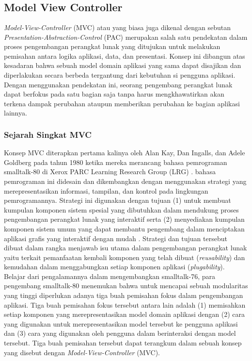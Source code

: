 \chapter{\babDua}

\section{Model View Controller}
\noindent
\textit{Model-View-Controller} (MVC) atau yang biasa juga dikenal dengan sebutan \textit{Presentation-Abstraction-Control} (PAC) merupakan salah satu pendekatan dalam proses pengembangan perangkat lunak yang ditujukan untuk melakukan pemisahan antara logika aplikasi, data, dan presentasi. Konsep ini dibangun atas kesadaran bahwa sebuah model domain aplikasi yang sama dapat disajikan dan diperlakukan secara berbeda tergantung dari kebutuhan si pengguna aplikasi. Dengan menggunakan pendekatan ini, seorang pengembang perangkat lunak dapat berfokus pada satu bagian saja tanpa harus mengkhawatirkan akan terkena dampak perubahan ataupun memberikan perubahan ke bagian aplikasi lainnya.

\subsection{Sejarah Singkat MVC}
\noindent
Konsep MVC diterapkan pertama kalinya oleh Alan Kay, Dan Ingalls, dan Adele Goldberg pada tahun 1980 ketika mereka merancang bahasa pemrograman smalltalk-80 di Xerox PARC Learning Research Group (LRG) \citep{krasner1988desc}. bahasa pemrograman ini didesain dan dikembangkan dengan menggunakan strategi yang merepresentasikan informasi, tampilan, dan kontrol pada lingkungan pemrogramannya. Strategi ini digunakan dengan tujuan (1) untuk membuat kumpulan komponen sistem spesial yang dibutuhkan dalam mendukung proses pengembangan perangkat lunak yang interaktif serta (2) menyediakan kumpulan komponen sistem umum yang dapat membantu pengembang dalam menciptakan aplikasi grafis yang interaktif dengan mudah \citep{krasner1988desc}. Strategi dan tujuan tersebut dibuat dalam rangka menjawab isu utama dalam pengembangan perangkat lunak yaitu terkait pemanfaatan kembali komponen yang telah dibuat (\textit{reusability}) dan kemudahan dalam menggabungkan setiap komponen aplikasi (\textit{plugability}). \\

\noindent
Belajar dari pengalamannya dalam mengembangkan smalltalk-76, para pengembang smalltalk-80 menemukan bahwa untuk mencapai sebuah modularitas yang tinggi diperlukan adanya tiga buah pemisahan fokus dalam pengembangan aplikasi. Tiga buah pemisahan fokus tersebut antara lain adalah (1) memisahkan setiap komponen yang merepresentasikan model domain aplikasi dengan (2) cara yang digunakan untuk merepresentasikan model tersebut ke pengguna aplikasi dan (3) cara yang digunakan oleh pengguna dalam berinteraksi dengan model tersebut. Tiga buah pemisahan tersebut dapat terangkum dalam sebuah konsep yang disebut dengan \textit{Model-View-Controller} (MVC).

